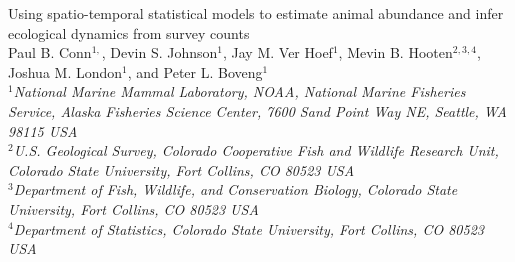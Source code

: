 \documentclass[12pt,english]{article}
\begin{document}
\begin{spacing}{1.9}


\begin{center}
Using spatio-temporal statistical models to estimate animal abundance and infer ecological dynamics from survey counts
\bigskip\\
\normalsize
{\sc Paul B. Conn$^{1,}$\footnotemark[5],
Devin S. Johnson$^1$, Jay M. Ver Hoef$^{1}$, Mevin B. Hooten$^{2,3,4}$, Joshua M. London$^1$, and Peter L. Boveng$^1$}\smallskip\\
$^1${\em National Marine Mammal Laboratory, NOAA, National Marine Fisheries Service,
Alaska Fisheries Science Center, 7600 Sand Point Way NE, Seattle,
WA 98115 USA }\\ \medskip
$^2${\em U.S. Geological Survey, Colorado Cooperative Fish and Wildlife Research Unit, Colorado State University, Fort Collins, CO 80523 USA }\\ \medskip
$^3${\em Department of Fish, Wildlife, and Conservation Biology, Colorado State University, Fort Collins, CO 80523 USA }\\ \medskip
$^4${\em Department of Statistics, Colorado State University, Fort Collins, CO 80523 USA }\\ \medskip
\end{center}


\raggedright \setlength{\parindent}{0.3in}
{}

\linenumbers


\end{spacing}
\end{document}
